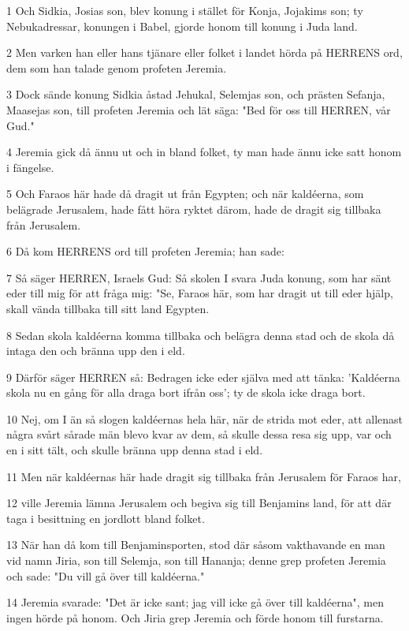 \par 1 Och Sidkia, Josias son, blev konung i stället för Konja, Jojakims son; ty Nebukadressar, konungen i Babel, gjorde honom till konung i Juda land.
\par 2 Men varken han eller hans tjänare eller folket i landet hörda på HERRENS ord, dem som han talade genom profeten Jeremia.
\par 3 Dock sände konung Sidkia åstad Jehukal, Selemjas son, och prästen Sefanja, Maasejas son, till profeten Jeremia och lät säga: "Bed för oss till HERREN, vår Gud."
\par 4 Jeremia gick då ännu ut och in bland folket, ty man hade ännu icke satt honom i fängelse.
\par 5 Och Faraos här hade då dragit ut från Egypten; och när kaldéerna, som belägrade Jerusalem, hade fått höra ryktet därom, hade de dragit sig tillbaka från Jerusalem.
\par 6 Då kom HERRENS ord till profeten Jeremia; han sade:
\par 7 Så säger HERREN, Israels Gud: Så skolen I svara Juda konung, som har sänt eder till mig för att fråga mig: "Se, Faraos här, som har dragit ut till eder hjälp, skall vända tillbaka till sitt land Egypten.
\par 8 Sedan skola kaldéerna komma tillbaka och belägra denna stad och de skola då intaga den och bränna upp den i eld.
\par 9 Därför säger HERREN så: Bedragen icke eder själva med att tänka: 'Kaldéerna skola nu en gång för alla draga bort ifrån oss'; ty de skola icke draga bort.
\par 10 Nej, om I än så slogen kaldéernas hela här, när de strida mot eder, att allenast några svårt sårade män blevo kvar av dem, så skulle dessa resa sig upp, var och en i sitt tält, och skulle bränna upp denna stad i eld.
\par 11 Men när kaldéernas här hade dragit sig tillbaka från Jerusalem för Faraos har,
\par 12 ville Jeremia lämna Jerusalem och begiva sig till Benjamins land, för att där taga i besittning en jordlott bland folket.
\par 13 När han då kom till Benjaminsporten, stod där såsom vakthavande en man vid namn Jiria, son till Selemja, son till Hananja; denne grep profeten Jeremia och sade: "Du vill gå över till kaldéerna."
\par 14 Jeremia svarade: "Det är icke sant; jag vill icke gå över till kaldéerna", men ingen hörde på honom. Och Jiria grep Jeremia och förde honom till furstarna.

